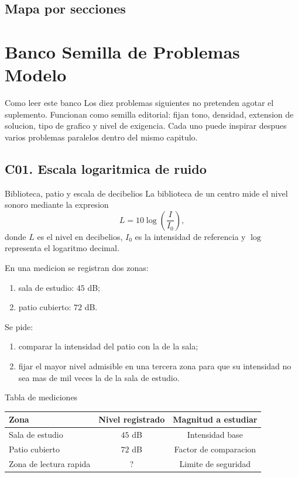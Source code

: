 \section{Mapa por secciones}



\chapter{Banco Semilla de Problemas Modelo}

\begin{planningbox}{Como leer este banco}
Los diez problemas siguientes no pretenden agotar el suplemento. Funcionan como semilla
editorial: fijan tono, densidad, extension de solucion, tipo de grafico y nivel de exigencia.
Cada uno puede inspirar despues varios problemas paralelos dentro del mismo capitulo.
\end{planningbox}

\section{C01. Escala logaritmica de ruido}

\begin{contextproblem}{Biblioteca, patio y escala de decibelios}
La biblioteca de un centro mide el nivel sonoro mediante la expresion
\[
L=10\log\left(\frac{I}{I_0}\right),
\]
donde \(L\) es el nivel en decibelios, \(I_0\) es la intensidad de referencia y \(\log\)
representa el logaritmo decimal.

En una medicion se registran dos zonas:
\begin{enumerate}
  \item sala de estudio: \(45\) dB;
  \item patio cubierto: \(72\) dB.
\end{enumerate}

Se pide:
\begin{enumerate}
  \item comparar la intensidad del patio con la de la sala;
  \item fijar el mayor nivel admisible en una tercera zona para que su intensidad no sea mas de
  mil veces la de la sala de estudio.
\end{enumerate}
\end{contextproblem}

\begin{databox}{Tabla de mediciones}
\begin{center}
\begin{tabular}{lcc}
\toprule
Zona & Nivel registrado & Magnitud a estudiar \\
\midrule
Sala de estudio & \(45\) dB & Intensidad base \\
Patio cubierto & \(72\) dB & Factor de comparacion \\
Zona de lectura rapida & ? & Limite de seguridad \\
\bottomrule
\end{tabular}
\end{center}
\end{databox}

